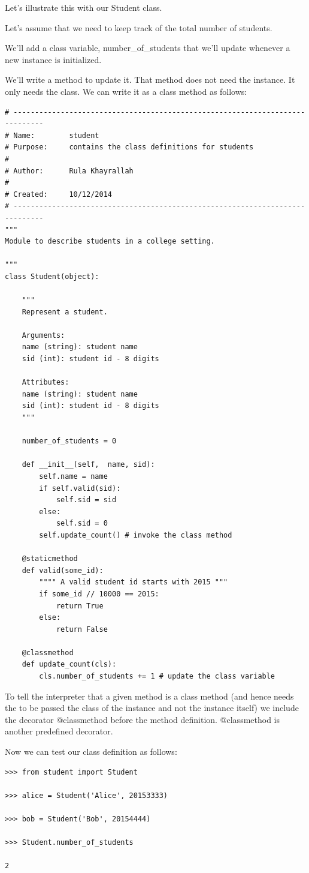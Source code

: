 \documentclass{article}
\begin{document}
Let's illustrate this with our Student class.

Let's assume that we need to keep track of the total number of students.

We'll add a class variable, number{\_}of{\_}students that we'll update whenever a new instance is initialized.

We'll write a method to update it.  That method does not need the instance.  It only needs the class.  We can write it as a class method as follows:

\begin{lstlisting}
# -----------------------------------------------------------------------------
# Name:        student
# Purpose:     contains the class definitions for students
#
# Author:      Rula Khayrallah
#
# Created:     10/12/2014
# -----------------------------------------------------------------------------
"""
Module to describe students in a college setting.
 
"""
class Student(object):
 
    """
    Represent a student.
 
    Arguments:
    name (string): student name
    sid (int): student id - 8 digits
 
    Attributes:
    name (string): student name
    sid (int): student id - 8 digits
    """
 
    number_of_students = 0
 
    def __init__(self,  name, sid):
        self.name = name
        if self.valid(sid):
            self.sid = sid
        else:
            self.sid = 0
        self.update_count() # invoke the class method
 
    @staticmethod
    def valid(some_id):
        """" A valid student id starts with 2015 """
        if some_id // 10000 == 2015:
            return True
        else:
            return False
 
    @classmethod
    def update_count(cls):
        cls.number_of_students += 1 # update the class variable
\end{lstlisting}

To tell the interpreter that a given method is a class method (and hence needs the to be passed the class of the instance and not the instance itself) we include the decorator @classmethod before the method definition.  @classmethod is another predefined decorator.

Now we can test our class definition as follows:

\begin{lstlisting}
>>> from student import Student

>>> alice = Student('Alice', 20153333)

>>> bob = Student('Bob', 20154444)

>>> Student.number_of_students

2
\end{lstlisting}
\end{document}
